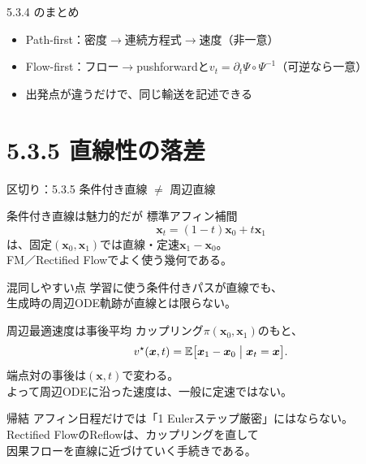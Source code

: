 \asmain
\begin{frame}{5.3.4 のまとめ}
    \begin{itemize}
        \item Path-first：密度$\to$連続方程式$\to$速度（非一意）
        \item Flow-first：フロー$\to$pushforwardと$v_t=\partial_t\Psi\circ\Psi^{-1}$（可逆なら一意）
        \item 出発点が違うだけで、同じ輸送を記述できる
    \end{itemize}
\end{frame}
\section{5.3.5 直線性の落差}
\asmain
\begin{frame}{区切り：5.3.5 条件付き直線 $\neq$ 周辺直線}
    \tableofcontents[currentsection]
\end{frame}
\asmain
\begin{frame}{条件付き直線は魅力的だが}
    標準アフィン補間
    \[
        \bm{x}_t=(1-t)\bm{x}_0+t\bm{x}_1
    \]
    は、固定$(\bm{x}_0,\bm{x}_1)$では直線・定速$\bm{x}_1-\bm{x}_0$。\\
    FM／Rectified Flowでよく使う幾何である。
    \begin{alertblock}{混同しやすい点}
        学習に使う条件付きパスが直線でも、\\
        生成時の周辺ODE軌跡が直線とは限らない。
    \end{alertblock}
\end{frame}
\asmain
\begin{frame}{周辺最適速度は事後平均}
    カップリング$\pi(\bm{x}_0,\bm{x}_1)$のもと、
    \[
        v^{\star}(\bm{x},t)
        =
        \mathbb{E}\bigl[\bm{x}_1-\bm{x}_0\bigm|\bm{x}_t=\bm{x}\bigr].
    \]
    端点対の事後は$(\bm{x},t)$で変わる。\\
    よって周辺ODEに沿った速度は、一般に定速ではない。
    \begin{block}{帰結}
        アフィン日程だけでは「1 Eulerステップ厳密」にはならない。\\
        Rectified FlowのReflowは、カップリングを直して\\
        因果フローを直線に近づけていく手続きである。
    \end{block}
\end{frame}
